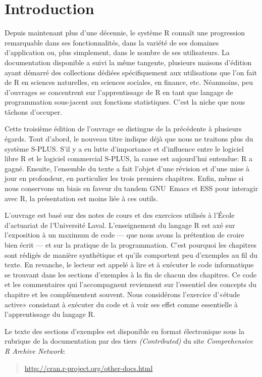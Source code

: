 \chapter*{Introduction}


Depuis maintenant plus d'une décennie, le système R connaît une
progression remarquable dans ses fonctionnalités, dans la variété de
ses domaines d'application ou, plus simplement, dans le nombre de ses
utilisateurs. La documentation disponible a suivi la même tangente,
plusieurs maisons d'édition ayant démarré des collections dédiées
spécifiquement aux utilisations que l'on fait de R en sciences
naturelles, en sciences sociales, en finance, etc. Néanmoins, peu
d'ouvrages se concentrent sur l'apprentissage de R en tant que langage
de programmation sous-jacent aux fonctions statistiques. C'est la
niche que nous tâchons d'occuper.

Cette troisième édition de l'ouvrage se distingue de la précédente
\citep{Goulet:introS:2007} à plusieurs égards. Tout d'abord, le
nouveau titre indique déjà que nous ne traitons plus du système
S-PLUS. S'il y a eu lutte d'importance et d'influence entre le
logiciel libre R et le logiciel commercial S-PLUS, la cause est
aujourd'hui entendue: R a gagné. Ensuite, l'ensemble du texte a fait
l'objet d'une révision et d'une mise à jour en profondeur, en
particulier les trois premiers chapitres. Enfin, même si nous
conservons un biais en faveur du tandem GNU~Emacs et ESS pour
interagir avec R, la présentation est moins liée à ces outils.

L'ouvrage est basé sur des notes de cours et des exercices utilisés à
l'École d'actuariat de l'Université Laval. L'enseignement du langage R
est axé sur l'exposition à un maximum de code --- que nous avons la
prétention de croire bien écrit --- et sur la pratique de la
programmation. C'est pourquoi les chapitres sont rédigés de manière
synthétique et qu'ils comportent peu d'exemples au fil du texte. En
revanche, le lecteur est appelé à lire et à exécuter le code
informatique se trouvant dans les sections d'exemples à la fin de
chacun des chapitres. Ce code et les commentaires qui l'accompagnent
reviennent sur l'essentiel des concepts du chapitre et les
complémentent souvent. Nous considérons l'exercice d'«étude active»
consistant à exécuter du code et à voir ses effet comme essentielle à
l'apprentissage du langage R.

Le texte des sections d'exemples est disponible en format électronique
sous la rubrique de la documentation par des tiers
\emph{(Contributed)} du site \emph{Comprehensive R Archive Network}:
\begin{quote}
  \url{http://cran.r-project.org/other-docs.html}
\end{quote}

